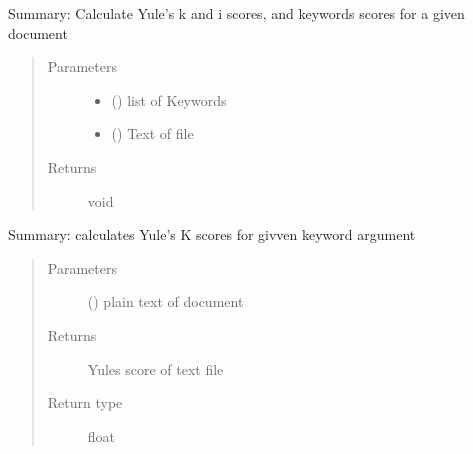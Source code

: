 \documentclass[letterpaper,10pt,english]{sphinxmanual}
\begin{document}
\begin{fulllineitems}
\label{\detokenize{functionsv1:analyze_functions.calculatescores}}
Summary: Calculate Yule’s k and i scores, and keywords scores for a given document
\begin{quote}\begin{description}
\item[{Parameters}] \leavevmode\begin{itemize}
\item {} 
 ({\hyperref[\detokenize{KeywordList:module-KeywordList}]{}}) \textendash{} list of Keywords

\item {} 
 (\sphinxstyleliteralemphasis{{[}}\sphinxstyleliteralemphasis{{]}}) \textendash{} Text of file

\end{itemize}

\item[{Returns}] \leavevmode
void

\end{description}\end{quote}

\end{fulllineitems}


\begin{fulllineitems}
\label{\detokenize{functionsv1:analyze_functions.calculateyulesscore}}
Summary: calculates Yule’s K scores for givven keyword argument
\begin{quote}\begin{description}
\item[{Parameters}] \leavevmode
{} (\sphinxstyleliteralemphasis{{[}}\sphinxstyleliteralemphasis{{]}}) \textendash{} plain text of document

\item[{Returns}] \leavevmode
Yules score of text file

\item[{Return type}] \leavevmode
float

\end{description}\end{quote}

\end{fulllineitems}
\end{document}
